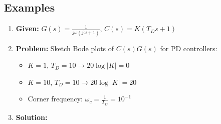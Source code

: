 \subsection{Examples}
\begin{example}
    \begin{enumerate}
        \item \textbf{Given:} $G(s) = \frac{1}{j \omega (j \omega + 1)}$, $C(s) = K(T_D s + 1)$
        \item \textbf{Problem:} Sketch Bode plots of $C(s)G(s)$ for PD controllers: 
        \begin{itemize}
            \item $K = 1$, $T_D = 10 \rightarrow 20 \log |K| = 0$
            \item $K = 10$, $T_D = 10 \rightarrow 20 \log |K| = 20$
            \item Corner frequency: $\omega_c = \frac{1}{T_D} = 10^{-1}$
        \end{itemize}
        \item \textbf{Solution:} 
    \end{enumerate}
\end{example}




